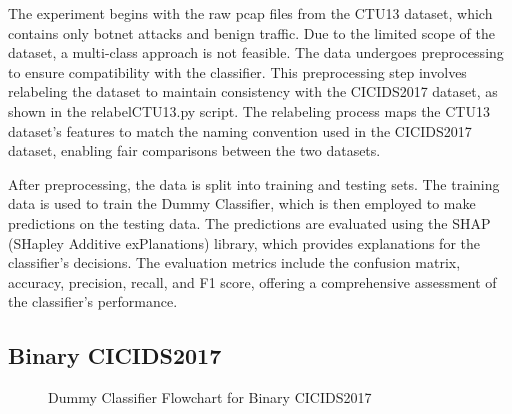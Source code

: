 The experiment begins with the raw pcap files from the CTU13 dataset, which contains only botnet attacks and benign traffic. Due to the limited scope of the dataset, a multi-class approach is not feasible. The data undergoes preprocessing to ensure compatibility with the classifier. This preprocessing step involves relabeling the dataset to maintain consistency with the CICIDS2017 dataset, as shown in the relabelCTU13.py script. The relabeling process maps the CTU13 dataset's features to match the naming convention used in the CICIDS2017 dataset, enabling fair comparisons between the two datasets.

After preprocessing, the data is split into training and testing sets. The training data is used to train the Dummy Classifier, which is then employed to make predictions on the testing data. The predictions are evaluated using the SHAP (SHapley Additive exPlanations) library, which provides explanations for the classifier's decisions. The evaluation metrics include the confusion matrix, accuracy, precision, recall, and F1 score, offering a comprehensive assessment of the classifier's performance.

\subsection{Binary CICIDS2017}

\begin{figure}[H]
\centering
{}
\caption{Dummy Classifier Flowchart for Binary CICIDS2017}\label{fig:DummyRandomFlowBinaryCICIDS2017}
\end{figure}


